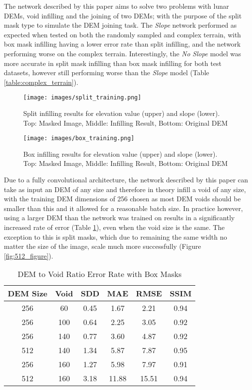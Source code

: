 \documentclass[twocolumn]{article}
\begin{document}
The network described by this paper aims to solve two problems with lunar DEMs, void infilling and the joining of two DEMs; with the purpose of the split mask type to simulate the DEM joining task.
The \emph{Slope} network performed as expected when tested on both the randomly sampled and complex terrain, with box mask infilling having a lower error rate than split infilling, and the network performing worse on the complex terrain.
Interestingly, the \emph{No Slope} model was more accurate in split mask infilling than box mask infilling for both test datasets, however still performing worse than the \emph{Slope} model (Table \ref{table:complex_terrain}).

\begin{figure*}
  \centering
  \texttt{[image: images/split\_training.png]}
  \captionsetup{justification=centering}
  \caption{Split infilling results for elevation value (upper) and slope (lower). \\ Top: Masked Image, Middle: Infilling Result,  Bottom: Original DEM}
  \label{fig:split_training}
\end{figure*}

\begin{figure*}
  \centering
  \texttt{[image: images/box\_training.png]}
  \captionsetup{justification=centering}
  \caption{Box infilling results for elevation value (upper) and slope (lower). \\ Top: Masked Image, Middle: Infilling Result,  Bottom: Original DEM}
  \label{fig:box_training}
\end{figure*}

Due to a fully convolutional architecture, the network described by this paper can take as input an DEM of any size and therefore in theory infill a void of any size, with the training DEM dimensions of 256 chosen as most DEM voids should be smaller than this and it allowed for a reasonable batch size.
In practice however, using a larger DEM than the network was trained on results in a significantly increased rate of error (Table \ref{table:void_size}), even when the void size is the same.
The exception to this is split masks, which due to remaining the same width no matter the size of the image, scale much more successfully (Figure \ref{fig:512_figure}).

\begin{table}[htbp]
\caption{\label{table:void_size}DEM to Void Ratio Error Rate with Box Masks}
\centering
\begin{tabular}{cccccc}
DEM Size & Void & SDD & MAE & RMSE & SSIM\\[0pt]
\hline
256 & 60 & 0.45 & 1.67 & 2.21 & 0.94\\[0pt]
256 & 100 & 0.64 & 2.25 & 3.05 & 0.92\\[0pt]
256 & 140 & 0.77 & 3.60 & 4.87 & 0.92\\[0pt]
512 & 140 & 1.34 & 5.87 & 7.87 & 0.95\\[0pt]
256 & 160 & 1.27 & 5.98 & 7.97 & 0.91\\[0pt]
512 & 160 & 3.18 & 11.88 & 15.51 & 0.94\\[0pt]
\end{tabular}
\end{table}
\end{document}
